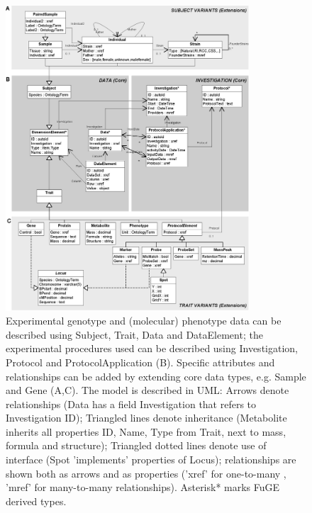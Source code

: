 \begin{figure}[h!]
  \centering
  \includegraphics[width=0.81\textwidth]{eps/image_5_3.eps}
  \caption[XGAP.]
    {Experimental genotype and (molecular) phenotype data can be described using Subject, Trait, Data and DataElement; 
    the experimental procedures used can be described using Investigation, Protocol and ProtocolApplication (B). Specific 
    attributes and relationships can be added by extending core data types, e.g. Sample and Gene (A,C). The model is 
    described in UML: Arrows denote relationships (Data has a field Investigation that refers to Investigation ID); 
    Triangled lines denote inheritance (Metabolite inherits all properties ID, Name, Type from Trait, next to mass, 
    formula and structure); Triangled dotted lines denote use of interface (Spot 'implements' properties of Locus); 
    relationships are shown both as arrows and as properties ('xref' for one-to-many , 'mref' for many-to-many 
    relationships). Asterisk* marks FuGE derived types.}
    \label{fig:XGAP}
\end{figure}

